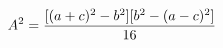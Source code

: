\documentclass[preview]{standalone}
\begin{document}
\begin{align*}
\special{dvisvgm:raw <g id='unique000'>}A^2 = \frac{[(a+c)^2-b^2][b^2-(a-c)^2]}{16}\special{dvisvgm:raw </g>}
\end{align*}
\end{document}
